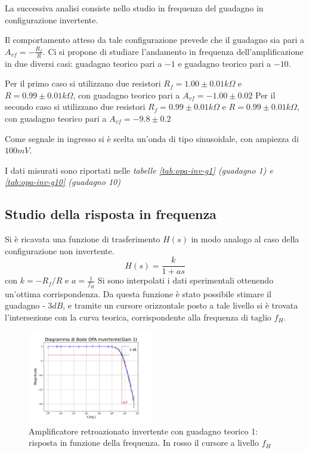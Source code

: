 \documentclass[journal]{IEEEtran}
\begin{document}
La successiva analisi consiste nello studio in frequenza del guadagno in configurazione invertente.

Il comportamento atteso da tale configurazione prevede che il guadagno sia pari a $A_{vf} = -\frac{R_f}{R}$. 
Ci si propone di studiare l'andamento in frequenza dell'amplificazione in due diversi casi: guadagno teorico pari a $-1$ e guadagno teorico pari a $-10$.

Per il primo caso si utilizzano due resistori $R_f = 1.00 \pm 0.01 k\Omega $ e $R = 0.99 \pm 0.01 k\Omega$, con guadagno teorico pari a $A_{vf} = -1.00 \pm 0.02 $ Per il secondo caso si utilizzano due resistori $R_f = 0.99 \pm 0.01 k\Omega $ e $R = 0.99 \pm 0.01 k\Omega$, con guadagno teorico pari a $A_{vf} = -9.8 \pm 0.2$

Come segnale in ingresso si è scelta un'onda di tipo sinusoidale, con ampiezza di $100 mV$.

I dati misurati sono riportati nelle \textit{tabelle \ref{tab:opa-inv-g1} (guadagno 1) e \ref{tab:opa-inv-g10} (guadagno 10)}

\subsection{\textbf{Studio della risposta in frequenza}}

Si è ricavata una funzione di trasferimento $H(s)$ in modo analogo al caso della configurazione non invertente. 
\[H(s) = \frac{k}{1+as}\]
con $k = -R_f/R$ e $a = \frac{1}{f_H}$ 
Si sono interpolati i dati sperimentali ottenendo un'ottima corrispondenza. Da questa funzione è stato possibile stimare il guadagno - $3 dB$, e tramite un cursore orizzontale posto a tale livello si è trovata l'intersezione con la curva teorica, corrispondente alla frequenza di taglio $f_H$.

\begin{figure}[H]%
\begin{center}
\includegraphics[width=0.48\textwidth]{analysis/output/OPA-bode_gain1(mag).pdf}
\caption{Amplificatore retroazionato invertente con guadagno teorico 1: risposta in funzione della frequenza. In rosso il cursore a livello $f_H$}
\label{fig:closed_loop_inv_gain_1}
\end{center}
\end{figure}
\end{document}
